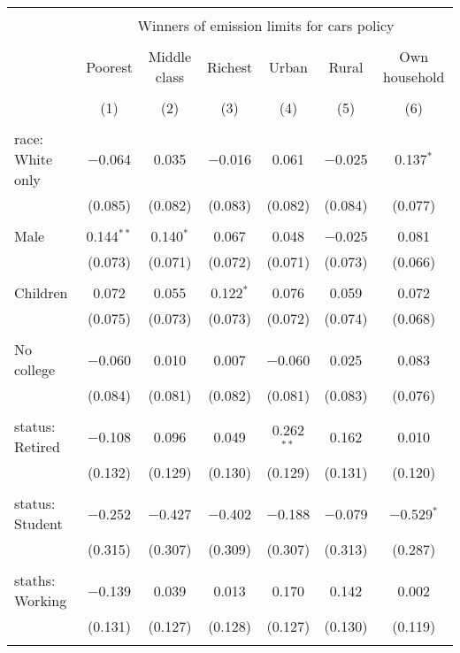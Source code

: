 
\begin{tabular}{@{\extracolsep{5pt}}lcccccc} 
\\[-1.8ex]\hline 
\hline \\[-1.8ex] 
 & \multicolumn{6}{c}{Winners of emission limits for cars policy} \\ 
\cline{2-7} 
\\[-1.8ex] & Poorest & Middle class & Richest & Urban & Rural & Own household \\ 
\\[-1.8ex] & (1) & (2) & (3) & (4) & (5) & (6)\\ 
\hline \\[-1.8ex] 
 race: White only & $-$0.064 & 0.035 & $-$0.016 & 0.061 & $-$0.025 & 0.137$^{*}$ \\ 
  & (0.085) & (0.082) & (0.083) & (0.082) & (0.084) & (0.077) \\ 
  & & & & & & \\ 
 Male & 0.144$^{**}$ & 0.140$^{*}$ & 0.067 & 0.048 & $-$0.025 & 0.081 \\ 
  & (0.073) & (0.071) & (0.072) & (0.071) & (0.073) & (0.066) \\ 
  & & & & & & \\ 
 Children & 0.072 & 0.055 & 0.122$^{*}$ & 0.076 & 0.059 & 0.072 \\ 
  & (0.075) & (0.073) & (0.073) & (0.072) & (0.074) & (0.068) \\ 
  & & & & & & \\ 
 No college & $-$0.060 & 0.010 & 0.007 & $-$0.060 & 0.025 & 0.083 \\ 
  & (0.084) & (0.081) & (0.082) & (0.081) & (0.083) & (0.076) \\ 
  & & & & & & \\ 
 status: Retired & $-$0.108 & 0.096 & 0.049 & 0.262$^{**}$ & 0.162 & 0.010 \\ 
  & (0.132) & (0.129) & (0.130) & (0.129) & (0.131) & (0.120) \\ 
  & & & & & & \\ 
 status: Student & $-$0.252 & $-$0.427 & $-$0.402 & $-$0.188 & $-$0.079 & $-$0.529$^{*}$ \\ 
  & (0.315) & (0.307) & (0.309) & (0.307) & (0.313) & (0.287) \\ 
  & & & & & & \\ 
 staths: Working & $-$0.139 & 0.039 & 0.013 & 0.170 & 0.142 & 0.002 \\ 
  & (0.131) & (0.127) & (0.128) & (0.127) & (0.130) & (0.119) \\ 
  & & & & & & \\ 

\end{tabular}
